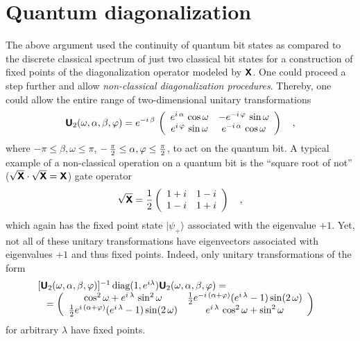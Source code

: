 \documentclass{llncs}
\begin{document}
\section{Quantum diagonalization}

The above argument used the continuity of quantum bit states as compared to the discrete classical spectrum of just
two classical bit states for a construction of fixed points of the
diagonalization operator modeled by $\textsf{\textbf{X}}$. One could proceed a step further and allow
{\em non-classical diagonalization procedures}. Thereby, one could allow
the entire range of two-dimensional unitary transformations~\cite{murnaghan}
\begin{equation}
\textsf{\textbf{U}}_2(\omega ,\alpha ,\beta ,\varphi )=e^{-i\,\beta}\,
\left(
\begin{array}{cc}
{e^{i\,\alpha }}\,\cos \omega
&
{-e^{-i\,\varphi }}\,\sin \omega
\\
{e^{i\,\varphi }}\,\sin \omega
&
{e^{-i\,\alpha }}\,\cos \omega
 \end{array}
\right)
 \quad ,
\label{e:quid3}
\end{equation}
where $-\pi \le \beta ,\omega \le \pi$,
$-\, {\pi \over 2} \le  \alpha ,\varphi \le {\pi \over 2}$, to act on
the quantum bit.
A typical example of a non-classical operation on a quantum bit is
the ``square root of not''
($
\sqrt{\textsf{\textbf{X}}}
\cdot
\sqrt{\textsf{\textbf{X}}} =\textsf{\textbf{X}}$) gate operator
\begin{equation}
\sqrt{\textsf{\textbf{X}}} =
{1 \over 2}
\left(
\begin{array}{cc}
1+i&1-i
\\
1-i&1+i
 \end{array}
\right)
\quad ,
\end{equation}
which again has the fixed point state $\vert \psi_+ \rangle$ associated with the eigenvalue $+1$.
Yet, not all of these unitary transformations have eigenvectors
associated with eigenvalues $+1$ and thus fixed points.
Indeed, only
unitary transformations of the form
\begin{equation}
\begin{array}{c}
[\textsf{\textbf{U}}_2(\omega ,\alpha ,\beta ,\varphi )]^{-1}\,\mbox{diag}(1, e^{i\lambda
}) \textsf{\textbf{U}}_2(\omega ,\alpha ,\beta ,\varphi )=
\qquad
\qquad
\qquad
\qquad
\qquad  \\
=
\left(
\begin{array}{cc}
\cos^2 \omega  + e^{i\,\lambda} \,\sin^2 \omega
&
{1\over 2}
e^{-i\,\left(\alpha +\varphi \right) }
(e^{i\,\lambda}-1)
\sin (2\,\omega )
\\
{1\over 2}
 e^{i\,\left(\alpha +\varphi \right)}
(e^{i\,\lambda }-1)
\sin (2\,\omega )
&
e^{i\,\lambda }\,\cos^2 \omega  + \sin^2 \omega
 \end{array}
\right)
\end{array}
\end{equation}
for arbitrary $\lambda$ have fixed points.
\end{document}
